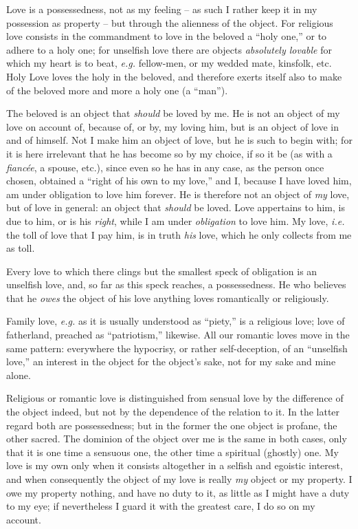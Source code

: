 Love is a possessedness, not as my feeling -- as such I rather keep it in my 
possession as property -- but through the alienness of the object. For 
religious love consists in the commandment to love in the beloved a ``holy 
one,'' or to adhere to a holy one; for unselfish love there are objects 
\textit{absolutely lovable} for which my heart is to beat, \textit{e.g.} 
fellow-men, or my wedded mate, kinsfolk, etc. Holy Love loves the holy in the 
beloved, and therefore exerts itself also to make of the beloved more and more 
a holy one (a ``man'').

The beloved is an object that \textit{should} be loved by me. He is not an 
object of my love on account of, because of, or by, my loving him, but is an 
object of love in and of himself. Not I make him an object of love, but he is 
such to begin with; for it is here irrelevant that he has become so by my 
choice, if so it be (as with a \textit{fianc\'ee}, a spouse, etc.), since even 
so he has in any case, as the person once chosen, obtained a ``right of his 
own to my love,'' and I, because I have loved him, am under obligation to 
love him forever. He is therefore not an object of \textit{my} love, but of 
love in general: an object that \textit{should} be loved. Love appertains to 
him, is due to him, or is his \textit{right}, while I am under 
\textit{obligation} to love him. My love, \textit{i.e.} the toll of love that 
I pay him, is in truth \textit{his} love, which he only collects from me as 
toll.

Every love to which there clings but the smallest speck of obligation is an 
unselfish love, and, so far as this speck reaches, a possessedness. He who 
believes that he \textit{owes} the object of his love anything loves 
romantically or religiously.

Family love, \textit{e.g.} as it is usually understood as ``piety,'' is a 
religious love; love of fatherland, preached as ``patriotism,'' likewise. 
All our romantic loves move in the same pattern: everywhere the hypocrisy, or 
rather self-deception, of an ``unselfish love,'' an interest in the object 
for the object's sake, not for my sake and mine alone.

Religious or romantic love is distinguished from sensual love by the 
difference of the object indeed, but not by the dependence of the relation to 
it. In the latter regard both are possessedness; but in the former the one 
object is profane, the other sacred. The dominion of the object over me is the 
same in both cases, only that it is one time a sensuous one, the other time a 
spiritual (ghostly) one. My love is my own only when it consists altogether in 
a selfish and egoistic interest, and when consequently the object of my love 
is really \textit{my} object or my property. I owe my property nothing, and 
have no duty to it, as little as I might have a duty to my eye; if 
nevertheless I guard it with the greatest care, I do so on my account.

